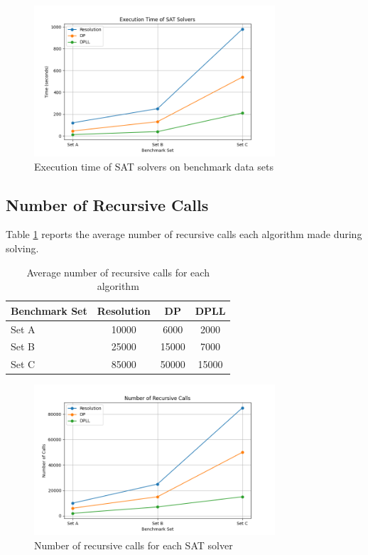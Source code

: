 \documentclass{article}
\begin{document}
\begin{figure}[h]
\centering
\includegraphics[width=0.8\textwidth]{execution_time.png}
\caption{Execution time of SAT solvers on benchmark data sets}
\label{fig:execution-time}
\end{figure}

\subsection{Number of Recursive Calls}

Table \ref{tab:recursive-calls} reports the average number of recursive calls each algorithm made during solving.

\begin{table}[h]
\centering
\begin{tabular}{lccc}
\hline
\textbf{Benchmark Set} & \textbf{Resolution} & \textbf{DP} & \textbf{DPLL} \\
\hline
Set A & 10000 & 6000 & 2000 \\
Set B & 25000 & 15000 & 7000 \\
Set C & 85000 & 50000 & 15000 \\
\hline
\end{tabular}
\caption{Average number of recursive calls for each algorithm}
\label{tab:recursive-calls}
\end{table}

\begin{figure}[h]
\centering
\includegraphics[width=0.8\textwidth]{recursive_calls.png}
\caption{Number of recursive calls for each SAT solver}
\label{fig:recursive-calls}
\end{figure}
\end{document}
